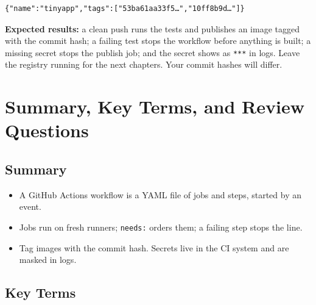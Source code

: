 \begin{enumerate}
  \begin{codeblock}

\begin{Shaded}
\begin{Highlighting}[]
\end{Highlighting}
\end{Shaded}

  \end{codeblock}

  \begin{codeblock}
  \begin{Verbatim}[formatcom=\outputstyle]
  {"name":"tinyapp","tags":["53ba61aa33f5…","10ff8b9d…"]}
  \end{Verbatim}
  \end{codeblock}
\end{enumerate}

\textbf{Expected results:} a clean push runs the tests and publishes an image tagged with the commit hash; a failing test stops the workflow before anything is built; a missing secret stops the publish job; and the secret shows as \texttt{***} in logs. Leave the registry running for the next chapters. Your commit hashes will differ.

\section{Summary, Key Terms, and Review Questions}\label{06-your-first-pipeline:summary-key-terms-and-review-questions}

\subsection*{Summary}\label{06-your-first-pipeline:summary}

\begin{itemize}
\tightlist
\item
  A GitHub Actions workflow is a YAML file of jobs and steps, started by an event.
\item
  Jobs run on fresh runners; \texttt{needs:} orders them; a failing step stops the line.
\item
  Tag images with the commit hash. Secrets live in the CI system and are masked in logs.
\end{itemize}


\subsection*{Key Terms}\label{06-your-first-pipeline:key-terms}

